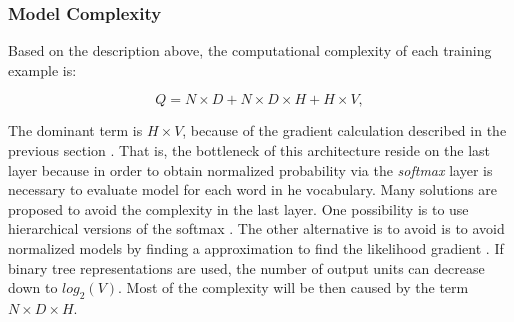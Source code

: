 \subsubsection{Model Complexity}
\label{sec:sub:sub:bengio_nnlm_complexity}
Based on the description above, the computational complexity of each training example is:

\begin{center}
\begin{equation} Q = N \times D + N \times D \times H + H \times V,   \end{equation}
\end{center}

The  dominant term is $H \times V$, because of the gradient calculation
described  in  the previous section \cite{DBLP:journals/corr/abs-1301-3781}. That is, the bottleneck of this architecture reside on the last layer because in order to obtain normalized probability via the \textit{softmax} layer is necessary to evaluate model for each word in he vocabulary.
Many solutions are proposed to avoid the complexity in the last layer. One possibility is to use  hierarchical
versions of the softmax \cite{Morin05hierarchicalprobabilistic,6163930}.
The other alternative is to avoid is to avoid  normalized models by finding
a approximation to find the likelihood gradient \cite{NIPS2013_5165} . If binary tree representations are
used, the number of output units can decrease down to $log_2(V)$. Most
of the complexity will be then caused by the term  $N \times D \times H$.




